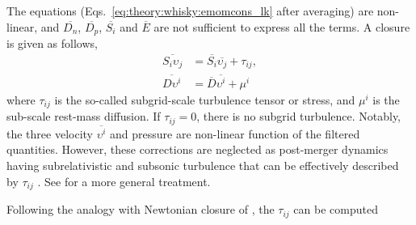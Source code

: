 The equations (Eqs.~\eqref{eq:theory:whisky:emomcons_lk} after averaging) 
are non-linear, and $\overline{D_{n}}$, $\overline{D_p}$, $\overline{S_i}$ and $\overline{E}$ 
are not sufficient to express all the terms.
A closure is given as follows,
%
\begin{equation}
\begin{aligned}
\overline{S_i\upsilon_j} &= \overline{S_i}\overline{\upsilon_j} + \tau_{ij}, \\
\overline{D\upsilon^i} &= \overline{D}\overline{\upsilon^i} + \mu^i
\end{aligned}
\end{equation}
%
where $\tau_{ij}$ is the so-called subgrid-scale turbulence tensor \citep{Radice:2017zta} 
or stress, and $\mu^i$ is the sub-scale rest-mass diffusion.
If $\tau_{ij}=0$, there is no subgrid turbulence. 
%
%
%
%
Notably, the three velocity $\overline{\upsilon^i}$ and pressure are non-linear function of the filtered quantities.
However, these corrections are neglected as post-merger dynamics having subrelativistic and subsonic turbulence that 
can be effectively described by $\tau_{ij}$ \citep{Radice:2020ids}.
See \citet{Carrasco:2019uzl,Vigano:2020ouc} for a more general treatment.
%


Following the analogy with Newtonian closure of \cite{Smagorinsky:1963}, 
the $\tau_{ij}$ can be computed \cite{Radice:2017zta}

